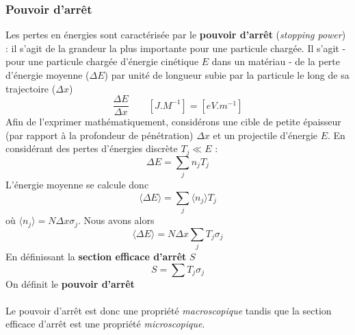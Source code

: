 \subsubsection{Pouvoir d'arrêt}
Les pertes en énergies sont caractérisée par le \textbf{pouvoir d'arrêt} (\textit{stopping power}) : il s'agit de la grandeur la plus importante pour une particule chargée. Il s'agit - pour une 
particule chargée d'énergie cinétique $E$ dans un matériau - de la perte d'énergie moyenne
($\Delta E$) par unité de longueur subie par la particule le long de sa trajectoire ($\Delta x$)
\begin{equation}
\dfrac{\Delta E}{\Delta x}\qquad [J.M^{-1}] = [eV.m^{-1}]
\end{equation}
Afin de l'exprimer mathématiquement, considérons une cible de petite épaisseur (par rapport 
à la profondeur de pénétration) $\Delta x$ et un projectile d'énergie $E$. En considérant des 
pertes d'énergies discrète $T_j \ll E$ :
\begin{equation}
\Delta E = \sum_j n_jT_j
\end{equation}
L'énergie moyenne se calcule donc
\begin{equation}
\langle \Delta E \rangle= \sum_j \langle n_j \rangle T_j
\end{equation}
où $\langle n_j\rangle=N\Delta x\sigma_j$. Nous avons alors
\begin{equation}
\langle \Delta E \rangle = N \Delta x \sum_j T_j \sigma_j
\end{equation}
En définissant la \textbf{section efficace d'arrêt} $S$
\begin{equation}
S = \sum T_j\sigma_j
\end{equation}
On définit le \textbf{pouvoir d'arrêt}\ \\

\ \\

Le pouvoir d'arrêt est donc une propriété \textit{macroscopique} tandis que la section 
efficace d'arrêt est une propriété \textit{microscopique}.

